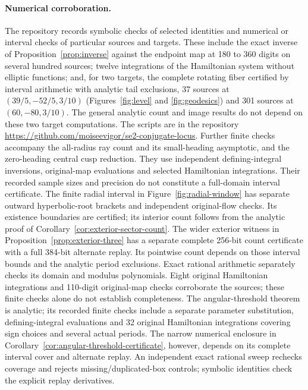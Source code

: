 \documentclass[11pt,a4paper]{article}
\theoremstyle{remark}\newtheorem{remark}[theorem]{Remark}
\begin{document}
\paragraph{Numerical corroboration.}
The repository records symbolic checks of selected identities and
numerical or interval checks of particular sources and targets. These
include the exact inverse of Proposition~\ref{prop:inverse} against the
endpoint map at 180 to 360 digits on several hundred sources; twelve integrations of
the Hamiltonian system without elliptic functions; and, for two targets,
the complete rotating fiber certified by interval arithmetic with
analytic tail exclusions, 37 sources at $(39/5,-52/5,3/10)$
(Figures~\ref{fig:level} and \ref{fig:geodesics}) and 301 sources at
$(60,-80,3/10)$. The general analytic count and image results do not
depend on these two target computations. The
scripts are in the repository
\url{https://github.com/moiseevigor/se2-conjugate-locus}.
Further finite checks accompany the all-radius ray count and its
small-heading asymptotic, and the zero-heading central cusp reduction.
They use independent defining-integral inversions, original-map
evaluations and selected Hamiltonian integrations. Their recorded
sample sizes and precision do not constitute a full-domain interval
certificate. The finite radial interval in
Figure~\ref{fig:radial-window} has separate outward hyperbolic-root
brackets and independent original-flow checks. Its existence boundaries
are certified; its interior count follows from the analytic proof of
Corollary~\ref{cor:exterior-sector-count}. The wider exterior witness in
Proposition~\ref{prop:exterior-three} has a separate complete 256-bit
count certificate with a full 384-bit alternate replay. Its pointwise
count depends on those interval bounds and the analytic period exclusions.
Exact rational arithmetic separately checks its domain and modulus
polynomials. Eight original Hamiltonian integrations and 110-digit
original-map checks corroborate the sources; these finite checks alone
do not establish completeness. The angular-threshold theorem is analytic;
its recorded finite checks include a separate parameter substitution,
defining-integral evaluations and 32 original Hamiltonian integrations
covering sign choices and several actual periods. The narrow numerical
enclosure in Corollary~\ref{cor:angular-threshold-certificate}, however,
depends on its complete interval cover and alternate replay. An independent
exact rational sweep rechecks coverage and rejects missing/duplicated-box
controls; symbolic identities check the explicit replay derivatives.
\end{document}
